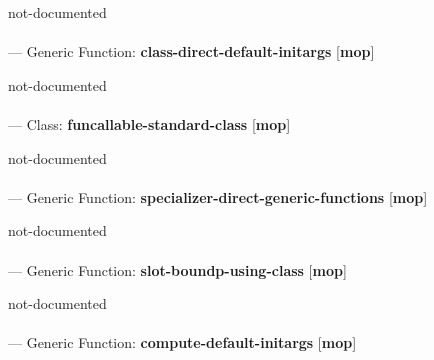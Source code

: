 \begin{adjustwidth}{5em}{5em}
not-documented
\end{adjustwidth}

\paragraph{}
\label{MOP:CLASS-DIRECT-DEFAULT-INITARGS}
--- Generic Function: \textbf{class-direct-default-initargs} [\textbf{mop}] \textit{}

\begin{adjustwidth}{5em}{5em}
not-documented
\end{adjustwidth}

\paragraph{}
\label{MOP:FUNCALLABLE-STANDARD-CLASS}
--- Class: \textbf{funcallable-standard-class} [\textbf{mop}] \textit{}

\begin{adjustwidth}{5em}{5em}
not-documented
\end{adjustwidth}

\paragraph{}
\label{MOP:SPECIALIZER-DIRECT-GENERIC-FUNCTIONS}
--- Generic Function: \textbf{specializer-direct-generic-functions} [\textbf{mop}] \textit{}

\begin{adjustwidth}{5em}{5em}
not-documented
\end{adjustwidth}

\paragraph{}
\label{MOP:SLOT-BOUNDP-USING-CLASS}
--- Generic Function: \textbf{slot-boundp-using-class} [\textbf{mop}] \textit{}

\begin{adjustwidth}{5em}{5em}
not-documented
\end{adjustwidth}

\paragraph{}
\label{MOP:COMPUTE-DEFAULT-INITARGS}
--- Generic Function: \textbf{compute-default-initargs} [\textbf{mop}] \textit{}


